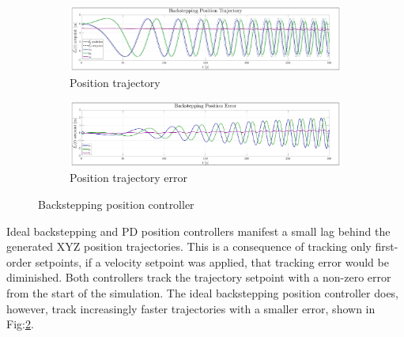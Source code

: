 \begin{figure}[htbp]
\centering
\vspace{-8pt}
\begin{subfigure}{0.9\textwidth}
\centering
\includegraphics[width=\textwidth]{graphs/IBC_Position_Trajectory}
\vspace{-18pt}
\caption{Position trajectory}
\label{fig:ibc_position_trajectory}
\end{subfigure}
\begin{subfigure}{0.9\textwidth}
\centering
\includegraphics[width=\textwidth]{graphs/IBC_Position_Error}
\vspace{-18pt}
\caption{Position trajectory error}
\label{fig:ibc_position_error}
\end{subfigure}
\vspace{-10pt}
\caption{Backstepping position controller}
\label{fig:ibc_position}
\end{figure}
Ideal backstepping and PD position controllers manifest a small lag behind the generated XYZ position trajectories. This is a consequence of tracking only first-order setpoints, if a velocity setpoint was applied, that tracking error would be diminished. Both controllers track the trajectory setpoint with a non-zero error from the start of the simulation. The ideal backstepping position controller does, however, track increasingly faster trajectories with a smaller error, shown in Fig:\ref{fig:ibc_position_error}.
